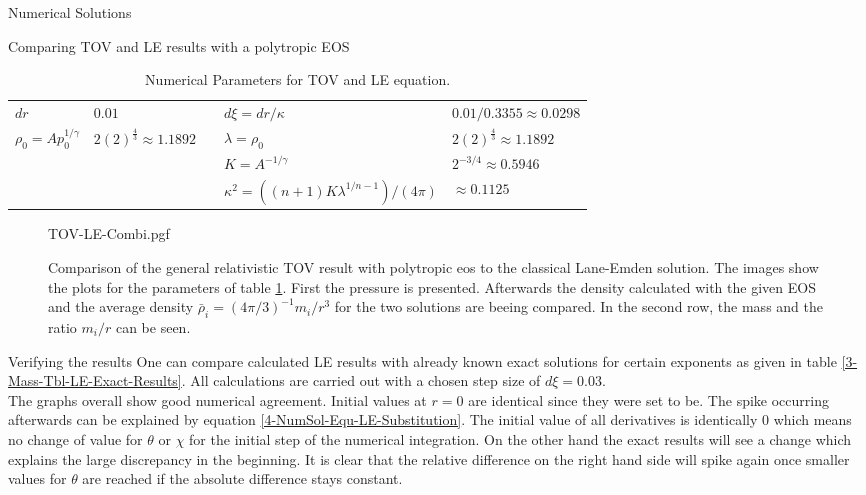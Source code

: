\begin{section}{Numerical Solutions}
\begin{subsection}{Comparing TOV and LE results with a polytropic EOS}
\begin{table}[H]
\begin{tabular}{@{}llcll@{}}
		$dr$ & $0.01$ && $d\xi=dr/\kappa$ & $0.01/0.3355\approx0.0298$\\
		\cmidrule{1-2} \cmidrule{4-5}
		$\rho_0=Ap_0^{1/\gamma}$ & $2(2)^{\frac{4}{3}}\approx1.1892$ && $\lambda=\rho_0$ & $2(2)^{\frac{4}{3}}\approx1.1892$\\
		&&& $K=A^{-1/\gamma}$ & $2^{-3/4}\approx0.5946$\\
		&&& $\kappa^2=((n+1)K\lambda^{1/n-1})/(4\pi)$ & $\approx0.1125$\\
		\bottomrule
	\end{tabular}
	\caption[Numerical Parameters for TOV and LE equation]{Numerical Parameters for \ac{TOV} and \ac{LE} equation.}
	\label{4-NumSol-Tbl-TOVParameters}
\end{table}%
\begin{figure}[H]
	\centering
	{TOV-LE-Combi.pgf}
	\caption[Comparison of the TOV and LE equation]{Comparison of the general relativistic \ac{TOV} result with polytropic \ac{eos} to the classical Lane-Emden solution.%
	The images show the plots for the parameters of table \ref{4-NumSol-Tbl-TOVParameters}. 
	First the pressure is presented. Afterwards the density calculated with the given EOS and the average density $\bar{\rho}_i=(4\pi/3)^{-1}m_i/r^3$ for the two solutions are beeing compared. In the second row, the mass and the ratio $m_i/r$ can be seen.}
	\label{4-NumSol-Plt-TOVEqEasyEOS}
\end{figure}
\end{subsection}
%
%
\begin{subsection}{Verifying the results}
\label{4-NumSol-Sec-Verifiying-the-results}
One can compare calculated \ac{LE} results with already known exact  solutions for certain exponents as given in table \ref{3-Mass-Tbl-LE-Exact-Results}. 
All calculations are carried out with a chosen step size of $d\xi=0.03$.\\
The graphs overall show good numerical agreement. 
Initial values at $r=0$ are identical since they were set to be. 
The spike occurring afterwards can be explained by equation \eqref{4-NumSol-Equ-LE-Substitution}. 
The initial value of all derivatives is identically $0$ which means no change of value for $\theta$ or $\chi$ for the initial step of the numerical integration. 
On the other hand the exact results will see a change which explains the large discrepancy in the beginning.
It is clear that the relative difference on the right hand side will spike again once smaller values for $\theta$ are reached if the absolute difference stays constant. 

\end{subsection}
\end{section}
